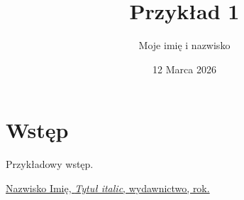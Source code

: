 \documentclass{article}
\title{Przykład 1}
\author{Moje imię i nazwisko}
\date{12 Marca 2026}
\begin{document}
\maketitle
\tableofcontents
\section{Wstęp}
Przykładowy wstęp.

\begin{thebibliography}{}

    \href{}{Nazwisko Imię, \textit{Tytuł italic}, wydawnictwo, rok.}

\end{thebibliography}
\end{document}
